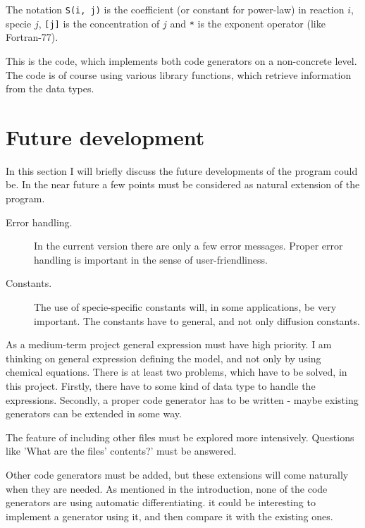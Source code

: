 The notation {\tt S(i, j)} is the coefficient (or constant for power-law) in reaction $i$, specie $j$, {\tt [j]} is
the concentration of $j$ and {\tt **} is the exponent operator (like Fortran-77).

This is the code, which implements both code generators on a non-concrete level. The code is of course using
various library functions, which retrieve information from the data types.


\section{Future development}
In this section I will briefly discuss the future developments 
of the program could be. In the near future a few points must be considered
as natural extension of the program.
\begin{description}
 \item[Error handling.] In the current version there are only
       a few error messages. Proper error handling is important
       in the sense of user-friendliness.
 \item[Constants.] The use of specie-specific constants will, in some applications,
       be very important. The constants have to general, and not only diffusion constants.
\end{description}

As a medium-term project general expression must have 
high priority. I am thinking on general expression defining
the model, and not only by using chemical equations. There is at least two problems, which
have to be solved,
in this project. Firstly, there have to some kind of data type to handle the
expressions. Secondly, a proper code generator has to be written - maybe existing
generators can be extended in some way.

The feature of including other files must be explored more intensively. 
Questions like 'What are the files' contents?' must be answered. 

Other code generators must be added, but these extensions will
come naturally when they are needed. As mentioned in the introduction, none of the
code generators are using automatic differentiating. it could be interesting to implement
a generator using it, and then compare it with the existing ones. 




